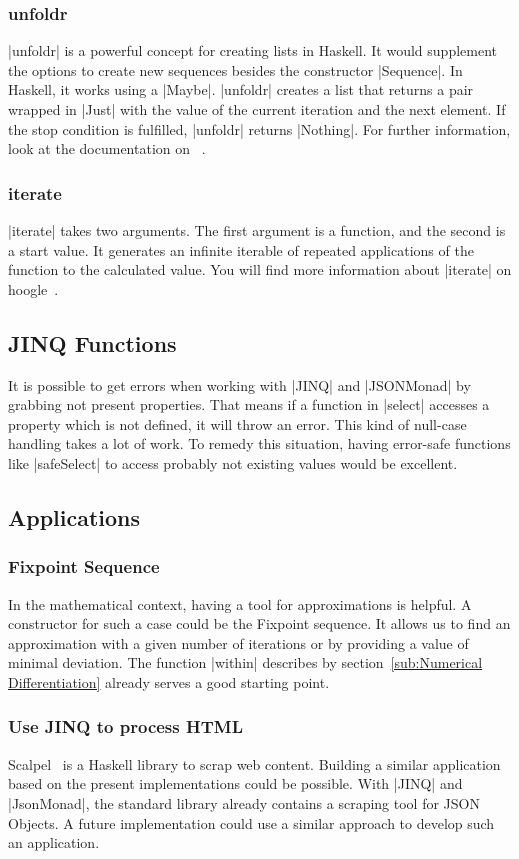 \subsubsection{unfoldr}
\label{subsub:unfoldr}
|unfoldr| is a powerful concept for creating lists in Haskell. It would
supplement the options to create new sequences besides the constructor |Sequence|. 
In Haskell, it works using a |Maybe|. |unfoldr| creates a list that returns a
pair wrapped in |Just| with the value of the current iteration and the next
element. If the stop condition is fulfilled, |unfoldr| returns |Nothing|. For
further information, look at the documentation on ~\cite{hoogle_unfoldr}.

\subsubsection{iterate}
\label{subsub:iterate}
|iterate| takes two arguments. The first argument is a function, and the second
is a start value. It generates an infinite iterable of repeated applications of
the function to the calculated value. You will find more information about
|iterate| on hoogle~\cite{hoogle_iterate}.

\subsection{JINQ Functions}
\label{sub:JINQ Functions}
It is possible to get errors when working with |JINQ| and |JSONMonad| by grabbing
not present properties. That means if a function in |select| accesses a property
which is not defined, it will throw an error. This kind of null-case handling
takes a lot of work. To remedy this situation, having error-safe functions like
|safeSelect| to access probably not existing values would be excellent.

\subsection{Applications}
\label{sub:Applications}
\subsubsection{Fixpoint Sequence}
\label{subsub:Fixpoint Sequence}
In the mathematical context, having a tool for approximations is helpful. A
constructor for such a case could be the Fixpoint sequence. It allows us to
find an approximation with a given number of iterations or by providing a value
of minimal deviation. The function |within| describes by
section~\ref{sub:Numerical Differentiation} already serves a good starting
point.

\subsubsection{Use JINQ to process HTML}
\label{subsub:Use JINQ to process HTML}
Scalpel~\cite{scalpel} is a Haskell library to scrap web content. Building a
similar application based on the present implementations could be possible.
With |JINQ| and |JsonMonad|, the standard library already contains a scraping
tool for JSON Objects. A future implementation could use a similar approach to
develop such an application.
